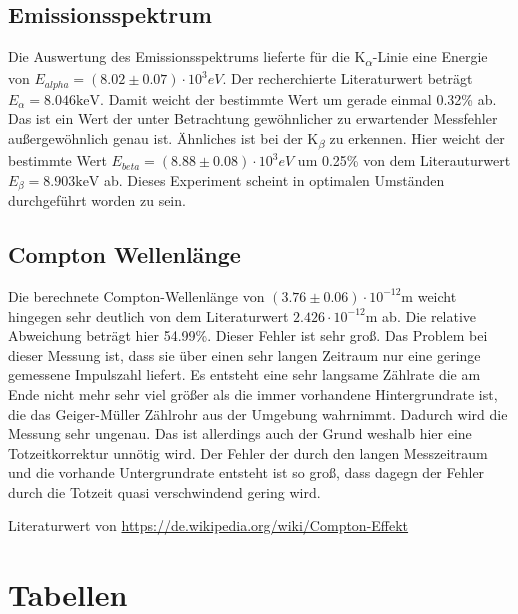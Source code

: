\subsection{Emissionsspektrum}

Die Auswertung des Emissionsspektrums lieferte für die K\textsubscript{$\alpha$}-Linie eine Energie von $E_{alpha} = (8.02 \pm 0.07) \cdot 10^{3} eV$. Der recherchierte Literaturwert beträgt $E_{\alpha} = 8.046 \text{keV}$. Damit weicht der bestimmte Wert um gerade einmal 0.32\% ab. Das ist ein Wert der unter Betrachtung gewöhnlicher zu erwartender Messfehler außergewöhnlich genau ist. Ähnliches ist bei der K\textsubscript{$\beta$} zu erkennen. Hier weicht der bestimmte Wert $E_{beta} = (8.88 \pm 0.08) \cdot 10^{3} eV$ um 0.25\% von dem Literauturwert $E_{\beta} = 8.903 \text{keV}$ ab. 
Dieses Experiment scheint in optimalen Umständen durchgeführt worden zu sein.

\subsection{Compton Wellenlänge}

Die berechnete Compton-Wellenlänge von $(3.76\pm 0.06)\cdot 10^{-12} \text{m}$ weicht hingegen sehr deutlich von dem Literaturwert $2.426\cdot 10^{-12} \text{m}$ ab.
Die relative Abweichung beträgt hier 54.99\%. Dieser Fehler ist sehr groß. Das Problem bei dieser Messung ist, dass sie über einen sehr langen Zeitraum nur eine geringe gemessene Impulszahl liefert. Es entsteht eine sehr langsame Zählrate die am Ende nicht mehr sehr viel größer als die immer vorhandene Hintergrundrate ist, die das Geiger-Müller Zählrohr aus der Umgebung wahrnimmt. Dadurch wird die Messung sehr ungenau. Das ist allerdings auch der Grund weshalb hier eine Totzeitkorrektur unnötig wird. Der Fehler der durch den langen Messzeitraum und die vorhande Untergrundrate entsteht ist so groß, dass dagegn der Fehler durch die Totzeit quasi verschwindend gering wird.


Literaturwert von \url{https://de.wikipedia.org/wiki/Compton-Effekt}
\section{Tabellen}

